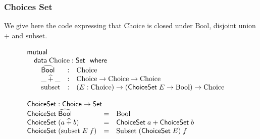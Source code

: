 \documentclass{beamer}
\newcommand{\ar}{\rightarrow}
\newcommand{\datarm}{\mathsf{data}}
\newcommand{\wheresf}{\mathsf{where}}
\newcommand{\Set}{\mathsf{Set}}
\newcommand{\mutual}{\mathsf{mutual}}
\newcommand{\Process}{\mathsf{Process}}
\newcommand{\Choice}{\mathsf{Choice}}
\newcommand{\ChoiceSet}{\mathsf{ChoiceSet}}
\newcommand{\Label}{\mathsf{Label}}
\newcommand{\node}{\mathsf{node}}
\newcommand{\terminate}{\mathsf{terminate}}
\newcommand{\Bool}{\mathrm{Bool}}
\newcommand{\Boolhat}{\widehat{\mathsf{Bool}}}
\newcommand{\plushat}{\mathbin{\widehat{+}}}
\newcommand{\Choi}{\mathrm{Choice}}
\newcommand{\pii}{\mathrm{PI}}
\newcommand{\pe}{\mathrm{PE}}
\newcommand{\lab}{\mathrm{Lab}}
\newcommand{\subsett}{\mathrm{subset}}
\newcommand{\Subsett}{\mathrm{Subset}}
\begin{document}
\begin{frame}
\frametitle{Choices Set}

We give here the code expressing that Choice is closed under $\Bool$, disjoint union $+$ and $\subsett$.



\[\begin{array}[t]{@{}l} 
\mutual\\
\mbox{\quad}
\begin{array}[t]{@{}l} 
\datarm\;\Choi : \Set\ \ \wheresf\\
\mbox{\quad} \begin{array}[t]{@{}lcl} 
\Boolhat &: & \Choi\\
\_\plushat\_ &:& \Choi \ar \Choi \ar \Choi\\
\subsett &:& (E : \Choi) \ar  (\ChoiceSet\; E \ar \Bool) \ar \Choi
\end{array} \end{array} \\
\\
\ChoiceSet : \Choice  \ar \Set \\
\begin{array}[t]{@{}lcl} 
\ChoiceSet\;\Boolhat &=& \Bool\\
\ChoiceSet\;(a \plushat b) &=& 
\ChoiceSet\;a + \ChoiceSet\;b \\
\ChoiceSet\;(\subsett\; E\; f) &=& \Subsett\; (\ChoiceSet\; E)\; f

\end{array} 
\end{array} 
\]

\end{frame}





%
%
%
%
\end{document}
